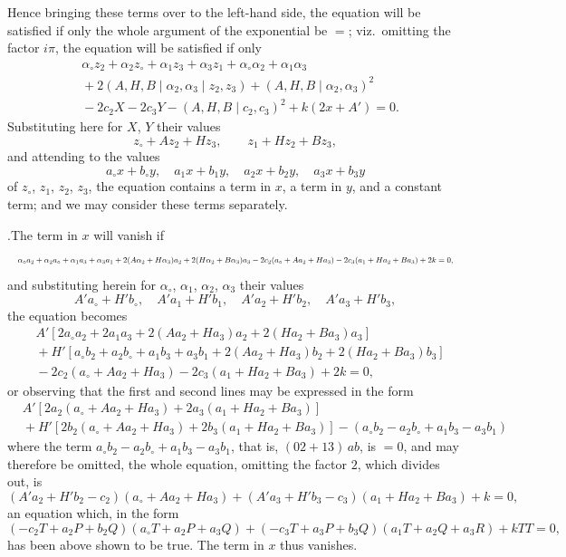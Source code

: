 \documentclass[11pt]{article}
\begin{document}
Hence bringing these terms over to the left-hand side, the equation will be satisfied if only the whole argument of the exponential be $=$; viz.\ omitting the factor $i\pi$, the equation will be satisfied if only
\begin{align*}
&\alpha_{\circ}z_2+\alpha_2z_{\circ}+\alpha_1z_3+\alpha_3z_1+\alpha_{\circ}\alpha_2+\alpha_1\alpha_3\\
&{}+ 2(A,H,B\mid \alpha_2,\alpha_3\mid z_2,z_3) + (A,H,B\mid \alpha_2,\alpha_3)^2\\
&{}- 2c_2X-2c_3Y-(A,H,B\mid c_2,c_3)^2 + k(2x+A') = 0.
\end{align*}
Substituting here for $X$, $Y$ their values
\[
z_{\circ}+Az_2+Hz_3,\qquad z_1+Hz_2+Bz_3,
\]
and attending to the values
\[
a_{\circ}x+b_{\circ}y,\quad a_1x+b_1y,\quad a_2x+b_2y,\quad a_3x+b_3y
\]
of $z_{\circ}$, $z_1$, $z_2$, $z_3$, the equation contains a term in $x$, a term in $y$, and a constant term; and we may consider these terms separately.

\medskip

.\quad The term in $x$ will vanish if
\[
\resizebox{\textwidth}{!}{$\displaystyle
\alpha_{\circ}a_2+\alpha_2a_{\circ}+\alpha_1a_3+\alpha_3a_1+2(A\alpha_2+H\alpha_3)a_2+2(H\alpha_2+B\alpha_3)a_3-2c_2(a_{\circ}+Aa_2+Ha_3)-2c_3(a_1+Ha_2+Ba_3)+2k = 0,
$}
\]
and substituting herein for $\alpha_{\circ}$, $\alpha_1$, $\alpha_2$, $\alpha_3$ their values
\[
A'a_{\circ}+H'b_{\circ},\quad A'a_1+H'b_1,\quad A'a_2+H'b_2,\quad A'a_3+H'b_3,
\]
the equation becomes
\begin{align*}
&A'[2a_{\circ}a_2+2a_1a_3+2(Aa_2+Ha_3)a_2+2(Ha_2+Ba_3)a_3]\\
&{}+ H'[a_{\circ}b_2+a_2b_{\circ}+a_1b_3+a_3b_1+2(Aa_2+Ha_3)b_2+2(Ha_2+Ba_3)b_3]\\
&{}- 2c_2(a_{\circ}+Aa_2+Ha_3)-2c_3(a_1+Ha_2+Ba_3)+2k = 0,
\end{align*}
or observing that the first and second lines may be expressed in the form
\begin{align*}
&A'[2a_2(a_{\circ}+Aa_2+Ha_3)+2a_3(a_1+Ha_2+Ba_3)]\\
&{}+ H'[2b_2(a_{\circ}+Aa_2+Ha_3)+2b_3(a_1+Ha_2+Ba_3)] - (a_{\circ}b_2-a_2b_{\circ}+a_1b_3-a_3b_1)
\end{align*}
where the term $a_{\circ}b_2-a_2b_{\circ}+a_1b_3-a_3b_1$, that is, $(02+13)\,ab$, is $=0$, and may therefore be omitted, the whole equation, omitting the factor $2$, which divides out, is
\[
(A'a_2+H'b_2-c_2)(a_{\circ}+Aa_2+Ha_3)+(A'a_3+H'b_3-c_3)(a_1+Ha_2+Ba_3)+k = 0,
\]
an equation which, in the form
\[
(-c_2T+a_2P+b_2Q)(a_{\circ}T+a_2P+a_3Q)+(-c_3T+a_3P+b_3Q)(a_1T+a_2Q+a_3R)+kTT = 0,
\]
has been above shown to be true. The term in $x$ thus vanishes.
\end{document}
